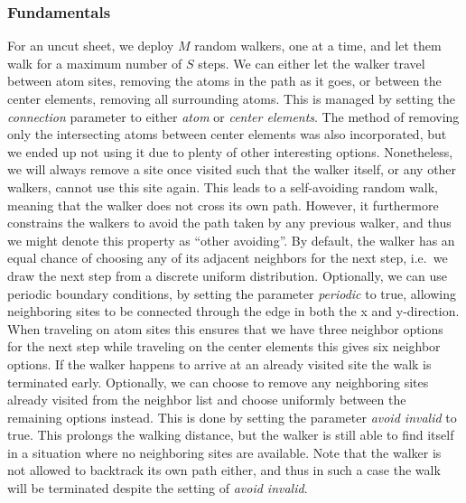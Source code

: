 \subsubsection{Fundamentals} %
For an uncut sheet, we deploy $M$ random walkers, one at a time, and let them
walk for a maximum number of $S$ steps. We can either let the walker travel
between atom sites, removing the atoms in the path as it goes, or between the
center elements, removing all surrounding atoms. This is managed by setting the
\textit{connection} parameter to either \textit{atom} or \textit{center
elements}. The method of removing only the intersecting atoms between center
elements was also incorporated, but we ended up not using it due to plenty of
other interesting options. Nonetheless, we will always remove a site once
visited such that the walker itself, or any other walkers, cannot use this site
again. This leads to a self-avoiding random walk, meaning that the walker does
not cross its own path. However, it furthermore constrains the walkers to avoid
the path taken by any previous walker, and thus we might denote this property as
``other avoiding''. By default, the walker has an equal chance of choosing any
of its adjacent neighbors for the next step, i.e.\ we draw the next step from a
discrete uniform distribution. Optionally, we can use periodic boundary
conditions, by setting the parameter \textit{periodic} to true,
allowing neighboring sites to be connected through the edge in both the x and
y-direction. When traveling on atom sites this ensures that we have three
neighbor options for the next step while traveling on the center elements this
gives six neighbor options. If the walker happens to arrive at an already
visited site the walk is terminated early. Optionally, we can choose to remove
any neighboring sites already visited from the neighbor list and choose
uniformly between the remaining options instead. This is done by setting the
parameter \textit{avoid invalid} to true. This prolongs the walking distance,
but the walker is still able to find itself in a situation where no neighboring
sites are available. Note that the walker is not allowed to backtrack its own
path either, and thus in such a case the walk will be terminated despite the
setting of \textit{avoid invalid}.


